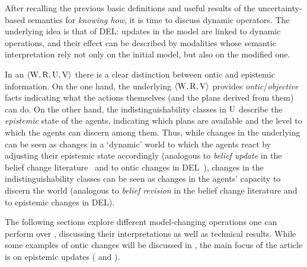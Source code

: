 \medskip

After recalling the previous basic definitions and useful results of the uncertainty-based semantics for \emph{knowing how}, it is time to discuss dynamic operators. The underlying idea is that of DEL: updates in the model are linked to dynamic operations, and their effect can be described by modalities whose semantic interpretation rely not only on the initial model, but also on the modified one. 

In an \ults $\langle \operatorname{W},\operatorname{R},\operatorname{U},\operatorname{V} \rangle$ there is a clear distinction between ontic and epistemic information. On the one hand, the underlying \lts $\langle \operatorname{W},\operatorname{R},\operatorname{V} \rangle$ provides \emph{ontic}/\emph{objective} facts indicating what the actions themselves (and the plans derived from them) can do. On the other hand, the indistinguishability classes in $\operatorname{U}$ describe the \emph{epistemic} state of the agents, indicating which plans are available and the level to which the agents can discern among them. Thus, while changes in the underlying \lts can be seen as changes in a `dynamic' world to which the agents react by adjusting their epistemic state accordingly (analogous to  \emph{belief update} in the belief change literature~\cite{sep-logic-belief-revision} and to ontic changes in DEL~\cite{vanDitmarschKooi2008}), changes in the indistinguishability classes can be seen as changes in the agents' capacity to discern the world (analogous to \emph{belief revision} in the belief change literature and to epistemic changes in DEL).

The following sections explore different model-changing operations one can perform over \ultss, discussing their interpretations as well as technical results. While some examples of ontic changes will be discussed in , the main focus of the article is on epistemic updates ( and ).





